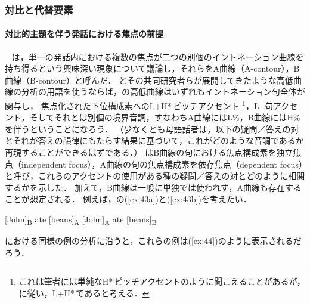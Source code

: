 \documentclass{goken}
\newcommand{\term}[2]{\textsf{#1}（#2）}
\newcommand{\ori}[1]{\noindent\textcolor[gray]{0.7}{\fontsize{8pt}{8pt}\selectfont{\textsf{(p.~#1)}}} }
\begin{document}
\pagebreak
\ori{47}
\subsubsection{対比と代替要素}\label{sec:2.2.2}

\paragraph{対比的主題を伴う発話における焦点の前提}\label{sec:2.2.2.1}
\ \newline\indent
\citet{Jackendoff1972}は，単一の発話内における複数の焦点が二つの別個のイントネーション曲線を持ち得るという興味深い現象について議論し，それらを\term{A曲線}{A-contour}，\term{B曲線}{B-contour}と呼んだ．
\citet{Pierrehumbert1980}とその共同研究者らが展開してきたような高低曲線の分析の用語を使うならば，\citeauthor{Jackendoff1972}の高低曲線はいずれもイントネーション句全体が関与し，
焦点化された下位構成素へのL+H*\,ピッチアクセント
\footnote{%
	これは筆者には単純なH*\,ピッチアクセントのように聞こえることがあるが，\citet{PierrehumbertHirschberg1990}に従い，L+H*\,であると考える．
}，L--\,句アクセント，そしてそれとは別個の境界音調，すなわちA曲線にはL\%，B曲線にはH\%\,を伴うということになろう．
（少なくとも母語話者は，以下の疑問／答えの対とそれが答えの韻律にもたらす結果に基づいて，これがどのような音調であるか再現することができるはずである．）
\citeauthor{Jackendoff1972}はB曲線の句における焦点構成素を\term{独立焦点}{independent focus}，A曲線の句の焦点構成素を\term{依存焦点}{dependent focus}と呼び，これらのアクセントの使用がある種の疑問／答えの対とどのように相関するかを示した．
加えて，B曲線は一般に単独では使われず，A曲線も存在することが想定される．
例えば，\citeauthor{Jackendoff1972}の(\ref{ex:43a})と(\ref{ex:43b})を考えたい．

\begin{exe}
	\ex\label{ex:43}
  \begin{xlist}
    \ex\label{ex:43a} [John]\textsubscript{B} ate [beans]\textsubscript{A} %
    \ex\label{ex:43b} [John]\textsubscript{A} ate [beans]\textsubscript{B} %
  \end{xlist}
\end{exe}

\noindent
\citealt{PierrehumbertHirschberg1990}における同様の例の分析に沿うと，これらの例は(\ref{ex:44})のように表示されるだろう．
\end{document}
